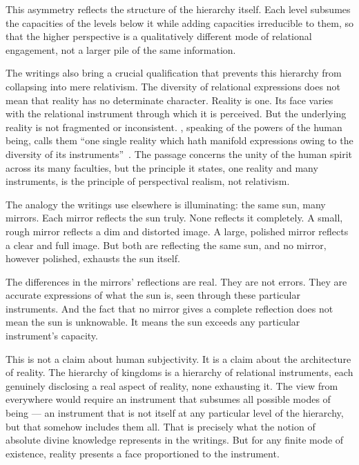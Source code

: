 This asymmetry reflects the structure of the hierarchy itself.
Each level subsumes the capacities of the levels below it while adding capacities irreducible to them, so that the higher perspective is a qualitatively different mode of relational engagement, not a larger pile of the same information.

The \bahai writings also bring a crucial qualification that prevents this hierarchy from collapsing into mere relativism.
The diversity of relational expressions does not mean that reality has no determinate character.
Reality is one.
Its face varies with the relational instrument through which it is perceived.
But the underlying reality is not fragmented or inconsistent.
\Bahaullah, speaking of the powers of the human being, calls them ``one single reality which hath manifold expressions owing to the diversity of its instruments''~\citep[para.~35]{SummonsLordHosts}.
The passage concerns the unity of the human spirit across its many faculties, but the principle it states, one reality and many instruments, is the principle of perspectival realism, not relativism.

The analogy the writings use elsewhere is illuminating: the same sun, many mirrors.
Each mirror reflects the sun truly.
None reflects it completely.
A small, rough mirror reflects a dim and distorted image.
A large, polished mirror reflects a clear and full image.
But both are reflecting the same sun, and no mirror, however polished, exhausts the sun itself.

The differences in the mirrors' reflections are real.
They are not errors.
They are accurate expressions of what the sun is, seen through these particular instruments.
And the fact that no mirror gives a complete reflection does not mean the sun is unknowable.
It means the sun exceeds any particular instrument's capacity.

This is not a claim about human subjectivity.
It is a claim about the architecture of reality.
The hierarchy of kingdoms is a hierarchy of relational instruments, each genuinely disclosing a real aspect of reality, none exhausting it.
The view from everywhere would require an instrument that subsumes all possible modes of being --- an instrument that is not itself at any particular level of the hierarchy, but that somehow includes them all.
That is precisely what the notion of absolute divine knowledge represents in the \bahai writings.
But for any finite mode of existence, reality presents a face proportioned to the instrument.


